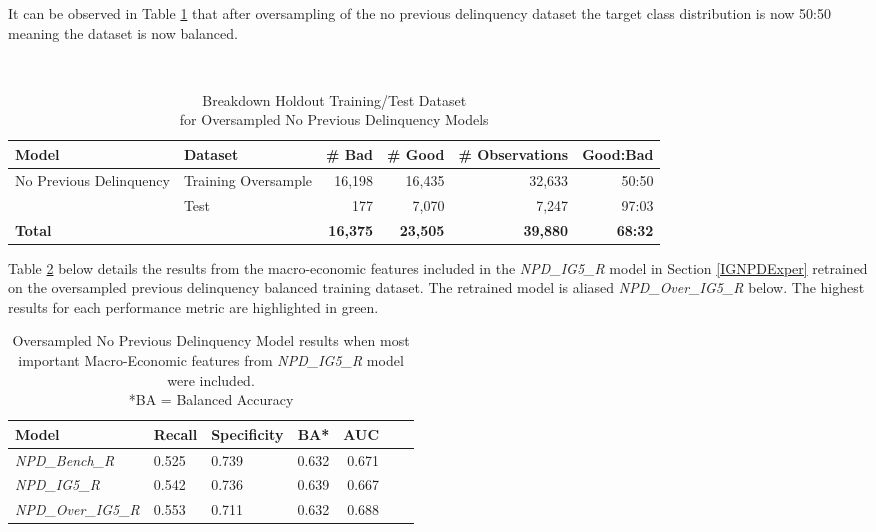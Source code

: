 It can be observed in Table \ref{table:oversample_train_testNPD} that after oversampling of the no previous delinquency dataset the target class distribution is now 50:50 meaning the dataset is now balanced.

\begin{table}[H]
	\centering\
	\resizebox{\textwidth}{!}
	{
		\begin{tabular}{l l r r r r}
			\hline
			\textbf{Model} &  \textbf{Dataset} & \textbf{\# Bad} & \textbf{\# Good} & \textbf{\# Observations} & \textbf{Good:Bad} \\
			\hline
			No Previous Delinquency & Training Oversample & 16,198 & 16,435 & 32,633 & 50:50 \\ 
			& Test & 177 & 7,070 & 7,247 & 97:03 	\\\hline
			\textbf{Total}     &  & \textbf{16,375} & \textbf{23,505} & \textbf{39,880} & \textbf{68:32} \\
			\hline
		\end{tabular}
	}
	\caption{Breakdown Holdout Training/Test Dataset \\for Oversampled No Previous Delinquency Models}
	\label{table:oversample_train_testNPD}
\end{table}

Table \ref{table:overNPD} below details the results from the macro-economic features included in the \textit{NPD\_IG5\_R} model in Section \ref{IGNPDExper} retrained on the oversampled previous delinquency balanced training dataset. The retrained model is aliased \textit{NPD\_Over\_IG5\_R} below. The highest results for each performance metric are highlighted in green.

\begin{table}[H]
	\centering
	\small
	\begin{tabular}{l l l r r r r}
		\hline
\textbf{Model} & \textbf{Recall} & \textbf{Specificity} & \textbf{BA*} & \textbf{AUC}  \\ \hline
\textit{NPD\_Bench\_R} & 0.525 & \cellcolor{green!25}0.739 & 0.632 & 0.671   \\ \hline
\textit{NPD\_IG5\_R} & 0.542 & 0.736 & \cellcolor{green!25}0.639 & 0.667   \\ 
\textit{NPD\_Over\_IG5\_R} &  \cellcolor{green!25}0.553 & 0.711 & 0.632 & \cellcolor{green!25}0.688   \\ \hline
	\end{tabular}
	\caption{{Oversampled No Previous Delinquency Model results when most \\important
			Macro-Economic features from \textit{NPD\_IG5\_R} model were included.
			\\ *BA = Balanced Accuracy}}
	\label{table:overNPD}
\end{table}

